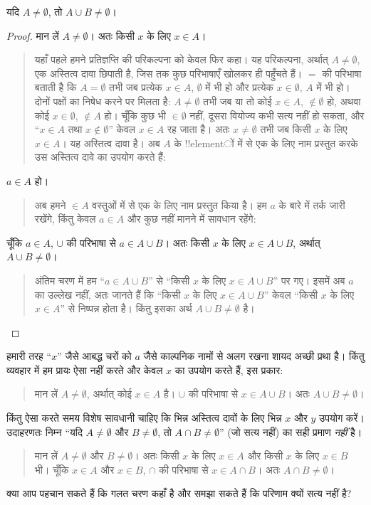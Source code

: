 \documentclass[../../../include/open-logic-section]{subfiles}
\begin{document}
\begin{prop}
यदि $A\neq\emptyset$, तो $A\cup B\neq\emptyset$।
\end{prop}

\begin{proof}
  मान लें $A\neq\emptyset$। अतः किसी $x$ के लिए $x\in A$।
  \begin{quote}
    यहाँ पहले हमने प्रतिज्ञप्ति की परिकल्पना को केवल फिर कहा। यह परिकल्पना,
    अर्थात् $A\neq\emptyset$, एक अस्तित्व दावा छिपाती है, जिस तक कुछ
    परिभाषाएँ खोलकर ही पहुँचते हैं। $=$ की परिभाषा बताती है कि
    $A=\emptyset$ तभी जब प्रत्येक $x\in A$, $\emptyset$ में भी हो और प्रत्येक
    $x\in\emptyset$, $A$ में भी हो। दोनों पक्षों का निषेध करने पर मिलता है:
    $A\neq\emptyset$ तभी जब या तो कोई $x\in A$, $\notin\emptyset$ हो, अथवा
    कोई $x\in\emptyset$, $\notin A$ हो। चूँकि कुछ भी $\in\emptyset$ नहीं,
    दूसरा वियोज्य कभी सत्य नहीं हो सकता, और ``$x\in A$ तथा
    $x\notin\emptyset$'' केवल $x\in A$ रह जाता है। अतः
    $x\neq\emptyset$ तभी जब किसी $x$ के लिए $x\in A$। यह अस्तित्व दावा है।
    अब $A$ के !!{element}ों में से एक के लिए नाम प्रस्तुत करके उस अस्तित्व
    दावे का उपयोग करते हैं:
  \end{quote}
  $a\in A$ हो।
  \begin{quote}
    अब हमने $\in A$ वस्तुओं में से एक के लिए नाम प्रस्तुत किया है। हम $a$
    के बारे में तर्क जारी रखेंगे, किंतु केवल $a\in A$ और कुछ नहीं मानने में
    सावधान रहेंगे:
  \end{quote}
  चूँकि $a\in A$, $\cup$ की परिभाषा से $a\in A\cup B$। अतः किसी $x$ के
  लिए $x\in A\cup B$, अर्थात् $A\cup B\neq\emptyset$।
  \begin{quote}
    अंतिम चरण में हम ``$a\in A\cup B$'' से ``किसी $x$ के लिए
    $x\in A\cup B$'' पर गए। इसमें अब $a$ का उल्लेख नहीं, अतः जानते हैं कि
    ``किसी $x$ के लिए $x\in A\cup B$'' केवल ``किसी $x$ के लिए $x\in A$''
    से निष्पन्न होता है। किंतु इसका अर्थ $A\cup B\neq\emptyset$ है।
  \end{quote}
\end{proof}

हमारी तरह ``$x$'' जैसे आबद्ध चरों को $a$ जैसे काल्पनिक नामों से अलग रखना
शायद अच्छी प्रथा है। किंतु व्यवहार में हम प्रायः ऐसा नहीं करते और केवल $x$
का उपयोग करते हैं, इस प्रकार:
\begin{quote}
मान लें $A\neq\emptyset$, अर्थात् कोई $x\in A$ है। $\cup$ की परिभाषा से
$x\in A\cup B$। अतः $A\cup B\neq\emptyset$।
\end{quote}
किंतु ऐसा करते समय विशेष सावधानी चाहिए कि भिन्न अस्तित्व दावों के लिए भिन्न
$x$ और $y$ उपयोग करें। उदाहरणतः निम्न ``यदि $A\neq\emptyset$ और
$B\neq\emptyset$, तो $A\cap B\neq\emptyset$'' (जो सत्य नहीं) का सही प्रमाण
\emph{नहीं} है।
\begin{quote}
मान लें $A\neq\emptyset$ और $B\neq\emptyset$। अतः किसी $x$ के लिए $x\in A$
और किसी $x$ के लिए $x\in B$ भी। चूँकि $x\in A$ और $x\in B$, $\cap$ की
परिभाषा से $x\in A\cap B$। अतः $A\cap B\neq\emptyset$।
\end{quote}
क्या आप पहचान सकते हैं कि गलत चरण कहाँ है और समझा सकते हैं कि परिणाम क्यों
सत्य नहीं है?
\end{document}
